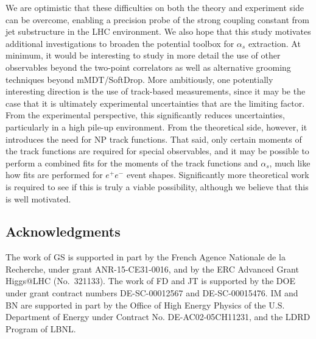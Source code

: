 \documentclass[11pt]{cernrep}
\begin{document}
We are optimistic that these difficulties on both the theory and experiment side can be overcome, enabling a precision probe of the strong coupling constant from jet substructure in the LHC environment.
%
We also hope that this study motivates additional investigations to broaden the potential toolbox for $\alpha_s$ extraction.
%
At minimum, it would be interesting to study in more detail the use of other observables beyond the two-point correlators as well as alternative grooming techniques beyond mMDT/SoftDrop.
%
More ambitiously, one potentially interesting direction is the use of track-based measurements, since it may be the case that it is ultimately experimental uncertainties that are the limiting factor.
%
From the experimental perspective, this significantly reduces uncertainties, particularly in a high pile-up environment.
%
From the theoretical side, however, it introduces the need for NP track functions.
%
That said, only certain moments of the track functions are required for special observables, and it may be possible to perform a combined fits for the moments of the track functions and $\alpha_s$, much like how fits are performed for $e^+e^-$ event shapes.
%
Significantly more theoretical work is required to see if this is truly a viable possibility, although we believe that this is well motivated.


\subsection*{Acknowledgments}

The work of GS is supported in part by the French Agence Nationale de la Recherche,
under grant ANR-15-CE31-0016, and by the ERC Advanced Grant Higgs@LHC
(No.\ 321133).
%
The work of FD and JT is supported by the DOE under grant contract numbers DE-SC-00012567 and DE-SC-00015476.
%
IM and BN are supported in part by the Office of High Energy Physics of the U.S. Department of Energy under Contract No. DE-AC02-05CH11231, and the LDRD Program of LBNL.


\end{document}
